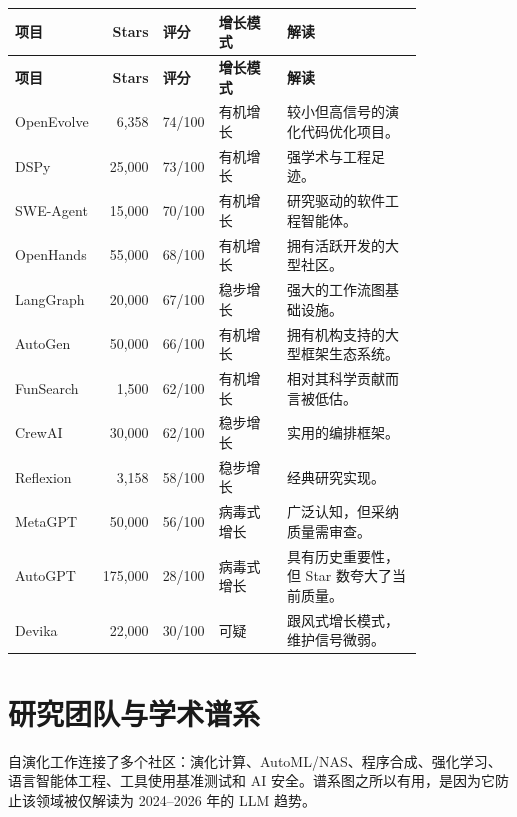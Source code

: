 {\TableTight
\begin{longtable}{@{}L{0.18\linewidth}r L{0.12\linewidth}L{0.17\linewidth}L{0.34\linewidth}@{}}
\toprule
\textbf{项目} & \textbf{Stars} & \textbf{评分} & \textbf{增长模式} & \textbf{解读} \\
\midrule
\endfirsthead
\toprule
\textbf{项目} & \textbf{Stars} & \textbf{评分} & \textbf{增长模式} & \textbf{解读} \\
\midrule
\endhead
\bottomrule
\endlastfoot
OpenEvolve & 6,358 & 74/100 & 有机增长 & 较小但高信号的演化代码优化项目。 \\
DSPy & 25,000 & 73/100 & 有机增长 & 强学术与工程足迹。 \\
SWE-Agent & 15,000 & 70/100 & 有机增长 & 研究驱动的软件工程智能体。 \\
OpenHands & 55,000 & 68/100 & 有机增长 & 拥有活跃开发的大型社区。 \\
LangGraph & 20,000 & 67/100 & 稳步增长 & 强大的工作流图基础设施。 \\
AutoGen & 50,000 & 66/100 & 有机增长 & 拥有机构支持的大型框架生态系统。 \\
FunSearch & 1,500 & 62/100 & 有机增长 & 相对其科学贡献而言被低估。 \\
CrewAI & 30,000 & 62/100 & 稳步增长 & 实用的编排框架。 \\
Reflexion & 3,158 & 58/100 & 稳步增长 & 经典研究实现。 \\
MetaGPT & 50,000 & 56/100 & 病毒式增长 & 广泛认知，但采纳质量需审查。 \\
AutoGPT & 175,000 & 28/100 & 病毒式增长 & 具有历史重要性，但 Star 数夸大了当前质量。 \\
Devika & 22,000 & 30/100 & 可疑 & 跟风式增长模式，维护信号微弱。 \\
\end{longtable}}

\section{研究团队与学术谱系}
\label{app:researchers}

自演化工作连接了多个社区：演化计算、AutoML/NAS、程序合成、强化学习、语言智能体工程、工具使用基准测试和 AI 安全。谱系图之所以有用，是因为它防止该领域被仅解读为 2024--2026 年的 LLM 趋势。

